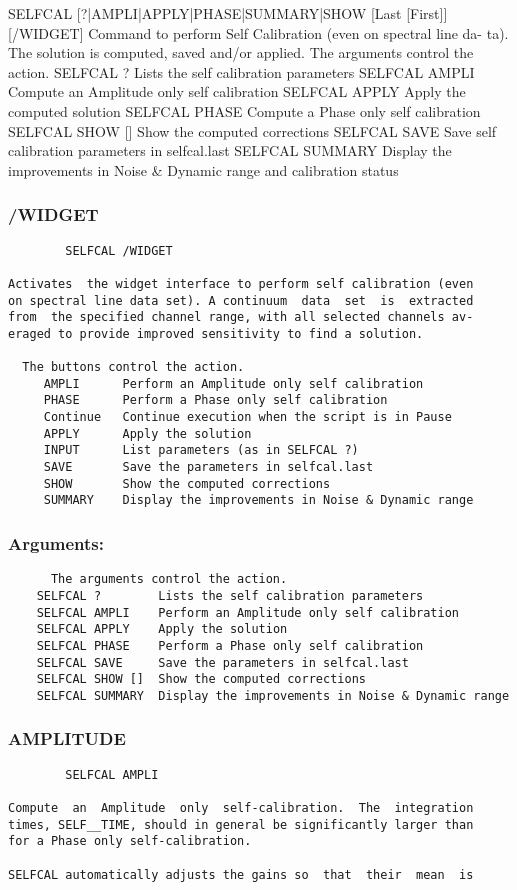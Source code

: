         SELFCAL  [?|AMPLI|APPLY|PHASE|SUMMARY|SHOW [Last [First]]
[/WIDGET]
  Command to perform Self Calibration (even on spectral line  da-
ta).  The solution is computed, saved and/or applied.
  The arguments control the action.
    SELFCAL ?        Lists the self calibration parameters
    SELFCAL AMPLI    Compute an Amplitude only self calibration
    SELFCAL APPLY    Apply the computed solution
    SELFCAL PHASE    Compute a Phase only self calibration
    SELFCAL SHOW []  Show the computed corrections
    SELFCAL SAVE     Save self calibration parameters in selfcal.last
    SELFCAL SUMMARY  Display the improvements in Noise & Dynamic range
                     and calibration status
\subsubsection{/WIDGET}
\begin{verbatim}
        SELFCAL /WIDGET

Activates  the widget interface to perform self calibration (even
on spectral line data set). A continuum  data  set  is  extracted
from  the specified channel range, with all selected channels av-
eraged to provide improved sensitivity to find a solution.

  The buttons control the action.
     AMPLI      Perform an Amplitude only self calibration
     PHASE      Perform a Phase only self calibration
     Continue   Continue execution when the script is in Pause
     APPLY      Apply the solution
     INPUT      List parameters (as in SELFCAL ?)
     SAVE       Save the parameters in selfcal.last
     SHOW       Show the computed corrections
     SUMMARY    Display the improvements in Noise & Dynamic range
\end{verbatim}
\subsubsection{Arguments:}
\begin{verbatim}
      The arguments control the action.
    SELFCAL ?        Lists the self calibration parameters
    SELFCAL AMPLI    Perform an Amplitude only self calibration
    SELFCAL APPLY    Apply the solution
    SELFCAL PHASE    Perform a Phase only self calibration
    SELFCAL SAVE     Save the parameters in selfcal.last
    SELFCAL SHOW []  Show the computed corrections
    SELFCAL SUMMARY  Display the improvements in Noise & Dynamic range
\end{verbatim}
\subsubsection{AMPLITUDE}
\begin{verbatim}
        SELFCAL AMPLI

Compute  an  Amplitude  only  self-calibration.  The  integration
times, SELF__TIME, should in general be significantly larger than
for a Phase only self-calibration.

SELFCAL automatically adjusts the gains so  that  their  mean  is
\end{verbatim}
